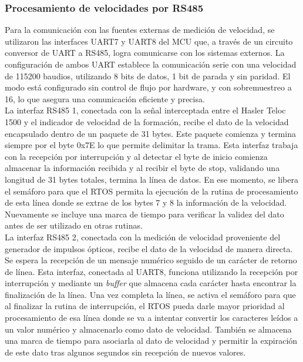 \subsubsection{Procesamiento de velocidades por RS485}

Para la comunicación con las fuentes externas de medición de velocidad, se utilizaron las interfaces UART7 y UART8 del MCU que, a través de un circuito conversor de UART a RS485, logra comunicarse con los sistemas externos. La configuración de ambos UART establece la comunicación serie con una velocidad de 115200 baudios, utilizando 8 bits de datos, 1 bit de parada y sin paridad. El modo está configurado sin control de flujo por hardware, y con sobremuestreo a 16, lo que asegura una comunicación eficiente y precisa. \\

La interfaz RS485 1, conectada con la señal interceptada entre el Hasler Teloc 1500 y el indicador de velocidad de la formación, recibe el dato de la velocidad encapsulado dentro de un paquete de 31 bytes. Este paquete comienza y termina siempre por el byte 0x7E lo que permite delimitar la trama. Esta interfaz trabaja con la recepción por interrupción y al detectar el byte de inicio comienza almacenar la información recibida y al recibir el byte de stop, validando una longitud de 31 bytes totales, termina la línea de datos. En ese momento, se libera el semáforo para que el RTOS permita la ejecución de la rutina de procesamiento de esta línea donde se extrae de los bytes 7 y 8 la información de la velocidad. Nuevamente se incluye una marca de tiempo para verificar la validez del dato antes de ser utilizado en otras rutinas. \\

La interfaz RS485 2, conectada con la medición de velocidad proveniente del generador de impulsos ópticos, recibe el dato de la velocidad de manera directa. Se espera la recepción de un mensaje numérico seguido de un carácter de retorno de línea. Esta interfaz, conectada al UART8, funciona utilizando la recepción por interrupción y mediante un \textit{buffer} que almacena cada carácter hasta encontrar la finalización de la línea. Una vez completa la línea, se activa el semáforo para que al finalizar la rutina de interrupción, el RTOS pueda darle mayor prioridad al procesamiento de esa línea donde se va a intentar convertir los caracteres leídos a un valor numérico y almacenarlo como dato de velocidad. También se almacena una marca de tiempo para asociarla al dato de velocidad y permitir la expiración de este dato tras algunos segundos sin recepción de nuevos valores. 